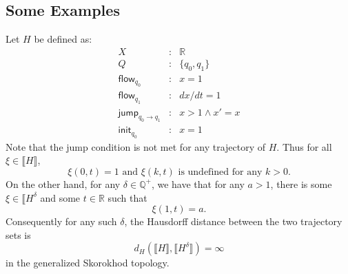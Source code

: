 \documentclass[envcountsect]{llncs}
\newcommand{\flow}{\mathsf{flow}}
\newcommand{\jump}{\mathsf{jump}}
\newcommand{\init}{\mathsf{init}}
\begin{document}
\subsection*{Some Examples}
\begin{example}
Let $H$ be defined as:
\begin{eqnarray*} 
X &:& \mathbb{R}\\
Q &:& \{q_0, q_1\}\\
\flow_{q_0} &:& x = 1\\
\flow_{q_1} &:& dx/dt = 1\\
\jump_{q_0\rightarrow q_1} &:& x >1 \wedge x' = x\\
\init_{q_0} &:& x=1
\end{eqnarray*}
Note that the jump condition is not met for any trajectory of $H$. Thus for all
$\xi\in \llbracket H\rrbracket$, 
$$\xi(0, t) = 1\mbox{ and }\xi(k,t)\mbox{ is undefined for any $k>0$.}$$
On the other hand, for any $\delta\in \mathbb{Q}^+$, we have that for any $a >
1$, there is some $\xi\in \llbracket H^{\delta}$ and some $t\in \mathbb{R}$ such
that
$$\xi(1, t) = a.$$
Consequently for any such $\delta$, the Hausdorff distance between the two
trajectory sets is
$$d_{H}(\llbracket H\rrbracket, \llbracket H^{\delta}\rrbracket) = \infty$$
in the generalized Skorokhod topology. 
\end{example}
\end{document}

